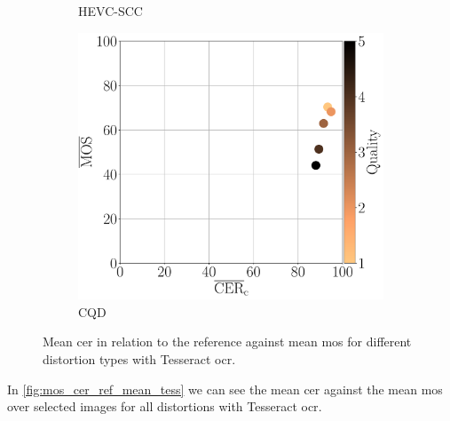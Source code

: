 \begin{figure}[h]
\begin{subfigure}[b]{0.3\textwidth}
        \caption{HEVC-SCC}
        \label{fig:mos_cer_ref_mean_tess_HEVC-SCC}
    \end{subfigure}
    \hfill
    \begin{subfigure}[b]{0.3\textwidth}
        \includegraphics[width=\textwidth]{../../images/analyze/mos_cer_ref_mean_tess_CQD.pdf}
        \caption{CQD}
        \label{fig:mos_cer_ref_mean_tess_CQD}
    \end{subfigure}
    \caption{Mean \gls{cer} in relation to the reference against mean \gls{mos} for different distortion types with Tesseract \gls{ocr}.}
\label{fig:mos_cer_ref_mean_tess}
\end{figure}

In \autoref{fig:mos_cer_ref_mean_tess} we can see the mean \gls{cer} against the mean \gls{mos} over selected images for all distortions with Tesseract \gls{ocr}.


